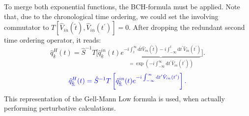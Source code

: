 \documentclass[
12pt, %
english, %
singlespacing, %
headsepline, %
]{MastersDoctoralThesis} %
\begin{document}
To merge both exponential functions, the BCH-formula must be applied. Note that, due to the chronological time ordering, we could set the involving commutator to $ T[\hat{V}_{in}(\tilde{t}),\hat{V}_{in}(t^{\prime})] = 0$. 
After dropping the redundant second time ordering operator, it reads:
\begin{equation}\label{3rd_expression_for_Omega_H}
\hat{q}^{H}_{\underline{k}}(t)
=
\hat{S}^{-1} 
T
\Big[
\hat{q}^{in}_{\underline{k}}(t)
\underbrace{
 e^{-i\int_{t}^{\infty}\mathrm{d}\tilde{t} \hat{V}_{in}(\tilde{t})-i\int_{-\infty}^{t}\mathrm{d}t^{\prime} \hat{V}_{in}(t^{\prime})}
 }_{
 =\exp(-i\int_{-\infty}^{\infty}\mathrm{d}t^{\prime} \hat{V}_{in}(t^{\prime}))
 }
\Big]
.
\end{equation}
 \begin{equation}\label{Gell_Mann-Low_for_one_Q_exp_form}
\begin{split}
 \textcolor[RGB]{0,0,204}{
\hat{q}^{H}_{\underline{k}}(t)
=
\hat{S}^{-1} 
T
\left[ 
\hat{q}^{in}_{\underline{k}}(t)
e^{-i\int_{-\infty}^{\infty}\mathrm{d}t^{\prime} \hat{V}_{in}(t^{\prime})}
\right]
.
}
\end{split}
\end{equation}
This representation of the Gell-Mann Low formula is used, when actually performing perturbative calculations.
\end{document}
